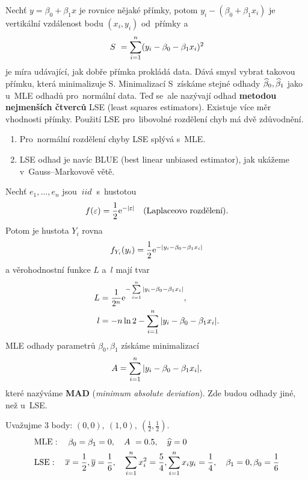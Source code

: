Nechť $y = \beta_0 + \beta_1 x$ je rovnice nějaké přímky, potom $y_i - (\beta_0 + \beta_1 x_i)$ je vertikální vzdálenost bodu $(x_i,y_i)$ od~přímky a~
 $$
 S~ = \sum\limits_{i=1}^{n} (y_i - \beta_0 - \beta_1 x_i)^2
 $$
je míra udávající, jak dobře přímka prokládá data. Dává smysl vybrat takovou přímku, která minimalizuje S. Minimalizací S~získáme stejné odhady $\widehat{\beta}_0, \widehat{\beta}_1$ jako u~MLE odhadů pro~normální data. Teď se~ale nazývají odhad \textbf{metodou nejmenších čtverců} LSE (least squares estimators).
Existuje více měr vhodnosti přímky. Použití LSE pro~libovolné rozdělení chyb má dvě zdůvodnění.
\begin{enumerate}
  \item Pro~normální rozdělení chyby LSE splývá s~MLE.
  \item LSE odhad je navíc BLUE (best linear unbiased estimator), jak ukážeme v~Gauss–Markovově větě.
\end{enumerate}

\begin{example}
Nechť $e_1,..., e_n$ jsou $~iid~$ s~hustotou
\begin{equation*}
  f(\varepsilon) = \frac{1}{2} \mathrm{e}^{- | \varepsilon |} \quad (\text{Laplaceovo rozdělení}).
\end{equation*}
Potom je hustota $Y_i$ rovna
\begin{equation*}
  f_{Y_i}(y_i) = \frac{1}{2} \mathrm{e}^{- | y_i - \beta_0 - \beta_1 x_i |}
\end{equation*}
a věrohodnostní funkce $L$ a~$l$ mají tvar
\begin{equation*}
\begin{aligned}
  L & = \frac{1}{2^n} \mathrm{e}^{- \sum\limits_{i=1}^{n} | y_i - \beta_0 - \beta_1 x_i |},  \\
  l & = -n \ln 2 - \sum\limits_{i=1}^{n} | y_i - \beta_0 - \beta_1 x_i | .
\end{aligned}
\end{equation*}
MLE odhady parametrů $\beta_0, \beta_1$ získáme minimalizací
 $$
A = \sum\limits_{i=1}^{n} | y_i - \beta_0 - \beta_1 x_i |,
 $$ které nazýváme \textbf{MAD} (\textit{minimum absolute deviation}). Zde budou odhady jiné, než u~LSE.

Uvažujme 3 body: $(0,0),~ (1,0),~ (\frac{1}{2},\frac{1}{2})$.
 $$
\begin{aligned}
&\mathrm{MLE}: \quad  \beta_0 = \beta_1 = 0, \quad A~ = 0.5
, \quad \widehat{y} = 0 \\
 &\mathrm{LSE}: \quad \overline{x} = \frac{1}{2}, \overline{y} = \frac{1}{6}, \quad \sum\limits_{i=1}^{n} x_i^2 = \frac{5}{4}, \sum\limits_{i=1}^{n} x_i y_i = \frac{1}{4}, \quad \beta_1 = 0, \beta_0 = \frac{1}{6}
  \end{aligned}
 $$
\end{example}


